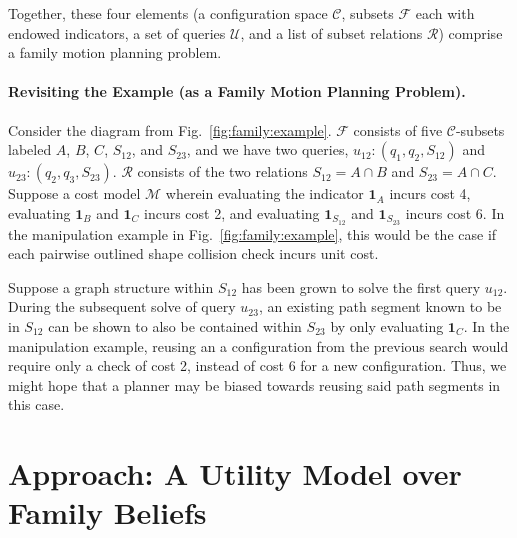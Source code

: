 Together, these four elements
(a configuration space $\mathcal{C}$,
subsets $\mathcal{F}$ each with endowed indicators,
a set of queries $\mathcal{U}$,
and a list of subset relations $\mathcal{R}$)
comprise a family motion planning problem.

\paragraph{Revisiting the Example (as a Family Motion Planning Problem).}
Consider the diagram from Fig.~\ref{fig:family:example}.
$\mathcal{F}$ consists of five $\mathcal{C}$-subsets labeled
$A$, $B$, $C$, $S_{12}$, and $S_{23}$,
and we have two queries,
$u_{12}: (q_1, q_2, S_{12})$
and
$u_{23}: (q_2, q_3, S_{23})$.
$\mathcal{R}$ consists of the two relations
$S_{12} = A \cap B$ and $S_{23} = A \cap C$.
Suppose a cost model $\mathcal{M}$
wherein evaluating the indicator
$\mathbf{1}_A$ incurs cost 4,
evaluating $\mathbf{1}_B$ and $\mathbf{1}_C$ incurs cost 2,
and evaluating $\mathbf{1}_{S_{12}}$ and $\mathbf{1}_{S_{23}}$
incurs cost 6.
In the manipulation example in
Fig.~\ref{fig:family:example},
this would be the case if each
pairwise outlined shape collision check incurs unit cost.

Suppose a graph structure within ${S_{12}}$ has been grown to solve
the first query $u_{12}$.
During the subsequent solve of query $u_{23}$,
an existing path segment known to be in ${S_{12}}$ can be shown to
also be contained within ${S_{23}}$ by only evaluating $\mathbf{1}_C$.
In the manipulation example,
reusing an a configuration from the previous search
would require only a check of cost 2,
instead of cost 6 for a new configuration.
Thus, we might hope that a planner may be biased towards reusing
said path segments in this case.


\section{Approach: A Utility Model over Family Beliefs}
\label{sec:family:approach}

